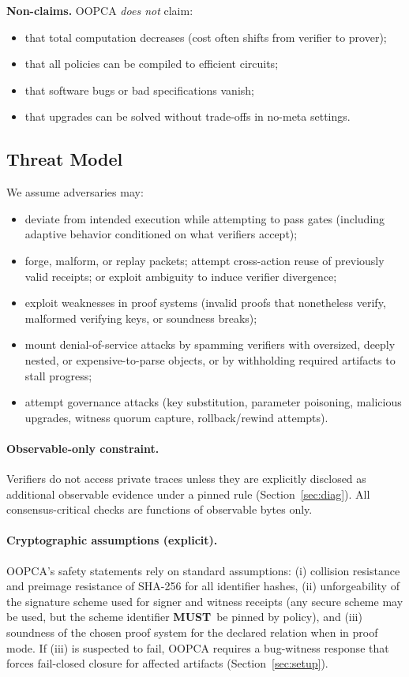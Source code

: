 \documentclass[11pt]{article}
\newcommand{\MUST}{\textbf{MUST}}
\begin{document}
\textbf{Non-claims.} OOPCA \emph{does not} claim:
\begin{itemize}[leftmargin=1.2em]
  \item that total computation decreases (cost often shifts from verifier to prover);
  \item that all policies can be compiled to efficient circuits;
  \item that software bugs or bad specifications vanish;
  \item that upgrades can be solved without trade-offs in no-meta settings.
\end{itemize}

\subsection{Threat Model}

We assume adversaries may:
\begin{itemize}[leftmargin=1.2em]
  \item deviate from intended execution while attempting to pass gates (including adaptive behavior conditioned on what verifiers accept);
  \item forge, malform, or replay packets; attempt cross-action reuse of previously valid receipts; or exploit ambiguity to induce verifier divergence;
  \item exploit weaknesses in proof systems (invalid proofs that nonetheless verify, malformed verifying keys, or soundness breaks);
  \item mount denial-of-service attacks by spamming verifiers with oversized, deeply nested, or expensive-to-parse objects, or by withholding required artifacts to stall progress;
  \item attempt governance attacks (key substitution, parameter poisoning, malicious upgrades, witness quorum capture, rollback/rewind attempts).
\end{itemize}

\paragraph{Observable-only constraint.}
Verifiers do not access private traces unless they are explicitly disclosed as additional observable evidence under a pinned rule (Section~\ref{sec:diag}).
All consensus-critical checks are functions of observable bytes only.

\paragraph{Cryptographic assumptions (explicit).}
OOPCA's safety statements rely on standard assumptions:
(i) collision resistance and preimage resistance of SHA-256 for all identifier hashes,
(ii) unforgeability of the signature scheme used for signer and witness receipts (any secure scheme may be used, but the scheme identifier \MUST\ be pinned by policy),
and (iii) soundness of the chosen proof system for the declared relation when in proof mode.
If (iii) is suspected to fail, OOPCA requires a bug-witness response that forces fail-closed closure for affected artifacts (Section~\ref{sec:setup}).
\end{document}
